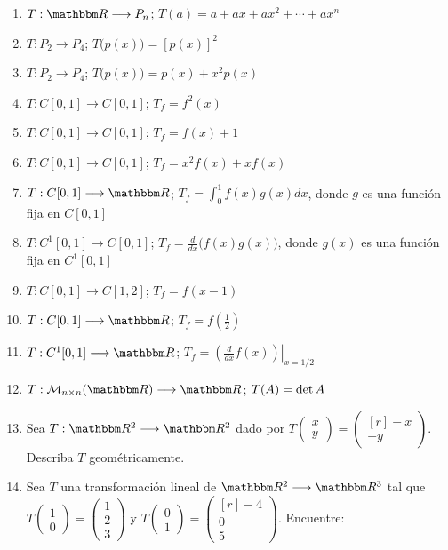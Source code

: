 \begin{enumerate}[start=18]
    \item $T: \RR \longrightarrow P_{n}$; $T(a)=a+a x+a x^{2}+\cdots+a x^{n}$
    \item $T: P_{2} \longrightarrow P_{4}$; $T\big(p(x)\big)=[p(x)]^{2}$
    \item $T: P_{2} \longrightarrow P_{4}$; $T\big(p(x)\big)=p(x)+x^{2} p(x)$
    \item $T: C[0,1] \longrightarrow C[0,1]$; $T_f=f^{2}(x)$
    \item $T: C[0,1] \longrightarrow C[0,1]$; $T_f=f(x)+1$
    \item $T: C[0,1] \longrightarrow C[0,1]$; $T_f=x^{2} f(x)+x f(x)$
    \item $T: C[0,1] \longrightarrow \RR$; $\displaystyle T_f=\int_{0}^{1} f(x) g(x) d x$, donde $g$ es una función fija en $C[0,1]$
    \item $T: C^{1}[0,1] \longrightarrow C[0,1]$; $\displaystyle T_f=\frac{d}{d x}\big(f(x) g(x)\big)$, donde $g(x)$ es una función fija en $C^{1}[0,1]$
    \item $T: C[0,1] \longrightarrow C[1,2]$; $T_f=f(x-1)$
    \item $T: C[0,1] \longrightarrow \RR$; $\displaystyle T_f=f\left(\frac{1}{2}\right)$
    \item $T: C^{1}[0,1] \longrightarrow \RR$; $\displaystyle T_f=\left.\left(\frac{d}{d x} f(x)\right)\right|_{x=1/2}$
    \item $T: \mathcal{M}_{n \times n}(\RR) \longrightarrow \RR$; $T(A)=\operatorname{det} A$
    \item Sea $T: \RR[2] \longrightarrow \RR[2]$ dado por $T\begin{pmatrix} x \\ y \end{pmatrix} = \begin{pmatrix*}[r] -x \\ -y \end{pmatrix*}$. Describa $T$ geométricamente.
    \item Sea $T$ una transformación lineal de $\RR[2] \longrightarrow \RR[3]$ tal que $T\begin{pmatrix*}1 \\ 0\end{pmatrix*}=\begin{pmatrix*}1 \\ 2 \\ 3\end{pmatrix*}$ y $T\begin{pmatrix*}0 \\ 1\end{pmatrix*}=\begin{pmatrix*}[r]-4 \\ 0 \\ 5\end{pmatrix*}$. Encuentre:

\end{enumerate}
